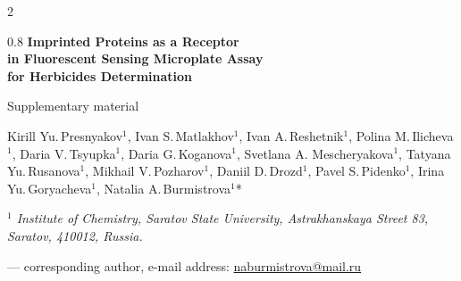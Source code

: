 
\usepackage{siunitx} %
\usepackage{tabulary} 
\usepackage{pdflscape} %
\usepackage{array} %
\usepackage{soul} %
\usepackage{hyperref}

\usepackage{blindtext}
\usepackage{multirow}
\renewcommand{\baselinestretch}{1.0}


%    
  \newpage
  \hypertarget{intro}{}
\begin{scriptsize}
   \setlength\columnsep{50pt}
   \begin{multicols}{2}
   \end{multicols}
\end{scriptsize}

\makeatletter
\renewcommand{\thefigure}{\textbf{S\@arabic\c@figure}}
\makeatletter
\renewcommand{\thesubsection}{S\@arabic\c@subsection}
\makeatletter
\renewcommand{\thetable}{\textbf{S\@arabic\c@table}}
\makeatletter
\renewcommand{\theequation}{S\@arabic\c@equation}
\makeatletter

\newpage
\thispagestyle{empty}

\begin{Huge} 
\begin{spacing}{0.8}
\noindent \textbf{Imprinted Proteins as a Receptor \\ in Fluorescent Sensing Microplate Assay \\ for Herbicides Determination } 

\noindent Supplementary material \\
\end{spacing}
\end{Huge}

\noindent Kirill Yu.\,Presnyakov$^{1}$, 
Ivan S.\,Matlakhov$^{1}$, 
Ivan A.\,Reshetnik$^{1}$, 
Polina M.\,Ilicheva$^{1}$, 
Daria V.\,Tsyupka$^{1}$, 
Daria G.\,Koganova$^{1}$, 
Svetlana A. Mescheryakova$^{1}$,
Tatyana Yu.\,Rusanova$^{1}$, 
Mikhail V.\,Pozharov$^{1}$, 
Daniil D.\,Drozd$^{1}$, 
Pavel S.\,Pidenko$^{1}$, 
Irina Yu.\,Goryacheva$^{1}$,
Natalia A.\,Burmistrova$^{1}$*  

\noindent \textit{$^{1}$ Institute of Chemistry, Saratov State University, Astrakhanskaya Street 83, Saratov, 410012, Russia.} 

\noindent * --- corresponding author, e-mail address: \href{naburmistrova@mail.ru}{naburmistrova@mail.ru}



